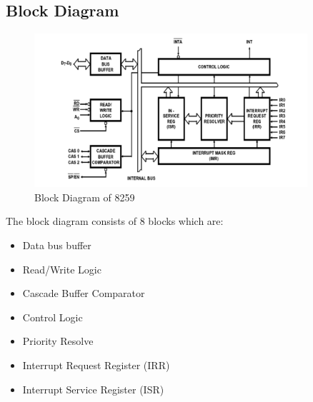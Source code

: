 \subsection{Block Diagram}

\begin{figure}[ht]
    \centering
    \includegraphics[width=0.9\textwidth]{res/practicals/8259.png}
    \caption{Block Diagram of 8259}
    \label{fig:8259}
\end{figure}

The block diagram consists of 8 blocks which are:

\begin{itemize}
    \item  Data bus buffer
    \item Read/Write Logic
    \item Cascade Buffer Comparator
    \item Control Logic
    \item Priority Resolve
    \item Interrupt Request Register (IRR)
    \item Interrupt Service Register (ISR)
\end{itemize}